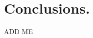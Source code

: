 \documentclass[../main.tex]{subfiles}
\begin{document}
\section{Conclusions.}
ADD ME
\end{document}
